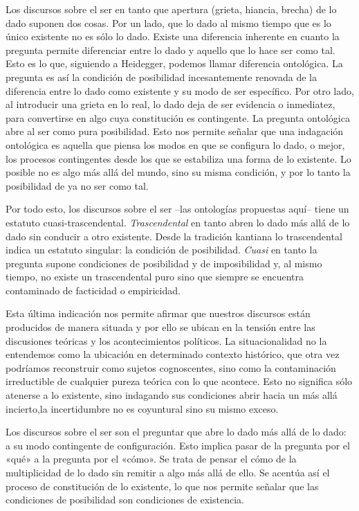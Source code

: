 Los discursos sobre el ser en tanto que apertura (grieta, hiancia, brecha) de lo dado suponen dos cosas. Por un lado, que lo dado al mismo tiempo que es lo único existente no es sólo lo dado. Existe una diferencia inherente en cuanto la pregunta permite diferenciar entre lo dado y aquello que lo hace ser como tal. Esto es lo que, siguiendo a Heidegger, podemos llamar diferencia ontológica. La pregunta es así la condición de posibilidad incesantemente renovada de la diferencia entre lo dado como existente y su modo de ser específico. Por otro lado, al introducir una grieta en lo real, lo dado deja de ser evidencia o inmediatez, para convertirse en algo cuya constitución es contingente. La pregunta ontológica abre al ser como pura posibilidad. Esto nos permite señalar que una indagación ontológica es aquella que piensa los modos en que se configura lo dado, o mejor, los procesos contingentes desde los que se estabiliza una forma de lo existente. Lo posible no es algo más allá del mundo, sino su misma condición, y por lo tanto la posibilidad de ya no ser como tal.

Por todo esto, los discursos sobre el ser --las ontologías propuestas aquí-- tiene un estatuto cuasi-trascendental. \emph{Trascendental} en tanto abren lo dado más allá de lo dado sin conducir a otro existente. Desde la tradición kantiana lo trascendental indica un estatuto singular: la condición de posibilidad. \emph{Cuasi} en tanto la pregunta supone condiciones de posibilidad y de imposibilidad y, al mismo tiempo, no existe un trascendental puro sino que siempre se encuentra contaminado de facticidad o empiricidad.

Esta última indicación nos permite afirmar que nuestros discursos están producidos de manera situada y por ello se ubican en la tensión entre las discusiones teóricas y los acontecimientos políticos. La situacionalidad no la entendemos como la ubicación en determinado contexto histórico, que otra vez podríamos reconstruir como sujetos cognoscentes, sino como la contaminación irreductible de cualquier pureza teórica con lo que acontece. Esto no significa sólo atenerse a lo existente, sino indagando sus condiciones abrir hacia un más allá incierto,la incertidumbre no es coyuntural sino su mismo exceso.

Los discursos sobre el ser son el preguntar que abre lo dado más allá de lo dado: a su modo contingente de configuración. Esto implica pasar de la pregunta por el «qué» a la pregunta por el «cómo». Se trata de pensar el cómo de la multiplicidad de lo dado sin remitir a algo más allá de ello. Se acentúa así el proceso de constitución de lo existente, lo que nos permite señalar que las condiciones de posibilidad son condiciones de existencia.

